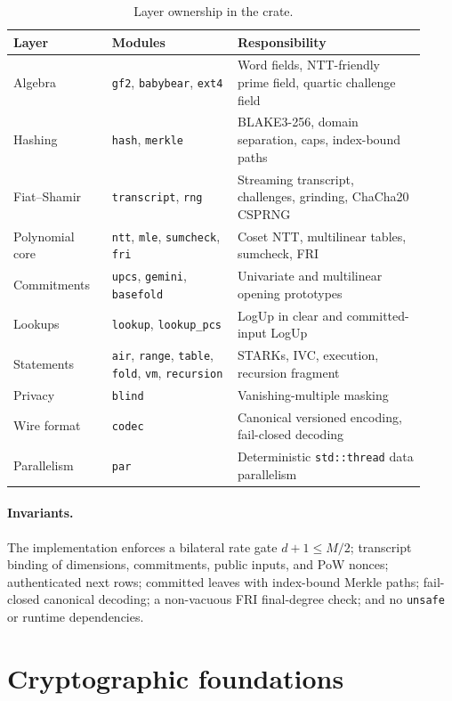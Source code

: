 \documentclass[11pt,a4paper]{article}
\begin{document}
\begin{table}[h]
\centering
\small
\begin{tabular}{@{}L{0.22\linewidth}L{0.28\linewidth}L{0.42\linewidth}@{}}
\toprule
Layer & Modules & Responsibility \\
\midrule
Algebra & \texttt{gf2}, \texttt{babybear}, \texttt{ext4} & Word fields, NTT-friendly prime field, quartic challenge field \\
Hashing & \texttt{hash}, \texttt{merkle} & BLAKE3-256, domain separation, caps, index-bound paths \\
Fiat--Shamir & \texttt{transcript}, \texttt{rng} & Streaming transcript, challenges, grinding, ChaCha20 CSPRNG \\
Polynomial core & \texttt{ntt}, \texttt{mle}, \texttt{sumcheck}, \texttt{fri} & Coset NTT, multilinear tables, sumcheck, FRI \\
Commitments & \texttt{upcs}, \texttt{gemini}, \texttt{basefold} & Univariate and multilinear opening prototypes \\
Lookups & \texttt{lookup}, \texttt{lookup\_pcs} & LogUp in clear and committed-input LogUp \\
Statements & \texttt{air}, \texttt{range}, \texttt{table}, \texttt{fold}, \texttt{vm}, \texttt{recursion} & STARKs, IVC, execution, recursion fragment \\
Privacy & \texttt{blind} & Vanishing-multiple masking \\
Wire format & \texttt{codec} & Canonical versioned encoding, fail-closed decoding \\
Parallelism & \texttt{par} & Deterministic \texttt{std::thread} data parallelism \\
\bottomrule
\end{tabular}
\caption{Layer ownership in the crate.}
\end{table}

\paragraph{Invariants.} The implementation enforces a bilateral rate gate
$d+1\le M/2$; transcript binding of dimensions, commitments, public inputs,
and PoW nonces; authenticated next rows; committed leaves with index-bound
Merkle paths; fail-closed canonical decoding; a non-vacuous FRI final-degree
check; and no \texttt{unsafe} or runtime dependencies.

\section{Cryptographic foundations}
\end{document}
